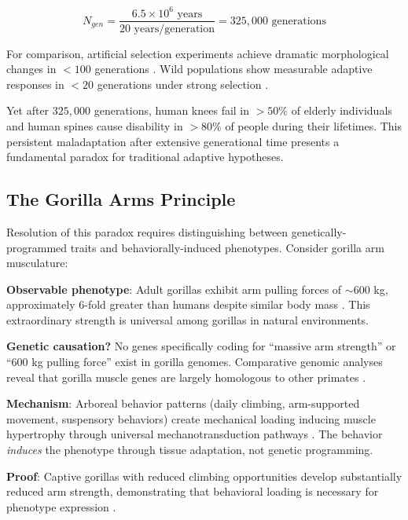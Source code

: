 \documentclass[12pt,a4paper]{article}
\begin{document}
\begin{equation}
N_{gen} = \frac{6.5 \times 10^6 \text{ years}}{20 \text{ years/generation}} = 325,000 \text{ generations}
\end{equation}

For comparison, artificial selection experiments achieve dramatic morphological changes in $<100$ generations \citep{weber1996phenotypic}. Wild populations show measurable adaptive responses in $<20$ generations under strong selection \citep{reznick1997independent}.

Yet after $325,000$ generations, human knees fail in $>50\%$ of elderly individuals and human spines cause disability in $>80\%$ of people during their lifetimes. This persistent maladaptation after extensive generational time presents a fundamental paradox for traditional adaptive hypotheses.

\subsection{The Gorilla Arms Principle}

Resolution of this paradox requires distinguishing between genetically-programmed traits and behaviorally-induced phenotypes. Consider gorilla arm musculature:

\textbf{Observable phenotype}: Adult gorillas exhibit arm pulling forces of $\sim$600 kg, approximately 6-fold greater than humans despite similar body mass \citep{schoenemann2006brain}. This extraordinary strength is universal among gorillas in natural environments.

\textbf{Genetic causation?} No genes specifically coding for ``massive arm strength'' or ``600 kg pulling force'' exist in gorilla genomes. Comparative genomic analyses reveal that gorilla muscle genes are largely homologous to other primates \citep{scally2012insights}.

\textbf{Mechanism}: Arboreal behavior patterns (daily climbing, arm-supported movement, suspensory behaviors) create mechanical loading inducing muscle hypertrophy through universal mechanotransduction pathways \citep{visscher2008assumption}. The behavior \textit{induces} the phenotype through tissue adaptation, not genetic programming.

\textbf{Proof}: Captive gorillas with reduced climbing opportunities develop substantially reduced arm strength, demonstrating that behavioral loading is necessary for phenotype expression \citep{myatt2011hindlimb}.
\end{document}
